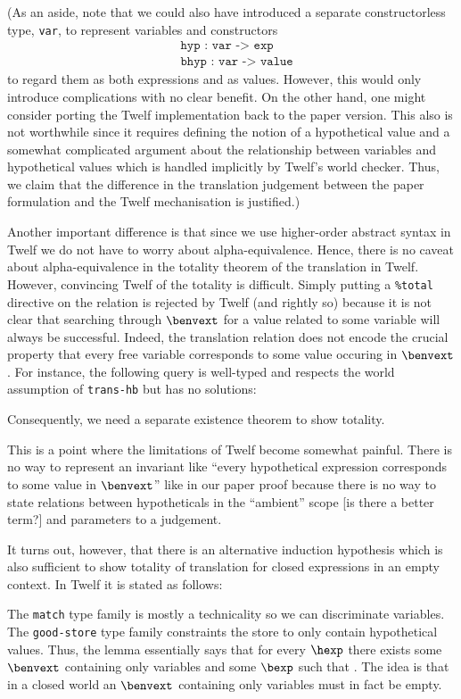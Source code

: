 (As an aside, note that we could also have introduced a separate constructorless type, \texttt{var}, to represent variables and constructors
\begin{align*}
  &\texttt{hyp : var -> exp} \\
  &\texttt{bhyp : var -> value}
\end{align*}
to regard them as both \hlang expressions and as \blang values.
However, this would only introduce complications with no clear benefit.
On the other hand, one might consider porting the Twelf implementation back to the paper version.
This also is not worthwhile since it requires defining the notion of a hypothetical value and a somewhat complicated argument about the relationship between variables and hypothetical values which is handled implicitly by Twelf's world checker.
Thus, we claim that the difference in the translation judgement between the paper formulation and the Twelf mechanisation is justified.)

Another important difference is that since we use higher-order abstract syntax in Twelf we do not have to worry about alpha-equivalence.
Hence, there is no caveat about alpha-equivalence in the totality theorem of the translation in Twelf.
However, convincing Twelf of the totality is difficult.
Simply putting a \texttt{\%total} directive on the relation is rejected by Twelf (and rightly so) because it is not clear that searching through $\benvext$ for a value related to some variable will always be successful.
Indeed, the translation relation does not encode the crucial property that every free variable corresponds to some value occuring in $\benvext$.
For instance, the following query is well-typed and respects the world assumption of \texttt{trans-hb} but has no solutions:

Consequently, we need a separate existence theorem to show totality.

This is a point where the limitations of Twelf become somewhat painful.
There is no way to represent an invariant like ``every hypothetical expression corresponds to some value in $\benvext$'' like in our paper proof because there is no way to state relations between hypotheticals in the ``ambient'' scope [is there a better term?] and parameters to a judgement.

It turns out, however, that there is an alternative induction hypothesis which is also sufficient to show totality of translation for closed expressions in an empty context.
In Twelf it is stated as follows:

The \texttt{match} type family is mostly a technicality so we can discriminate variables.
The \texttt{good-store} type family constraints the store to only contain hypothetical values.
Thus, the lemma essentially says that for every $\hexp$ there exists some $\benvext$ containing only variables and some $\bexp$ such that \trahb{\hbctx}{\benvext}{\bexp}{\hexp}.
The idea is that in a closed world an $\benvext$ containing only variables must in fact be empty.

